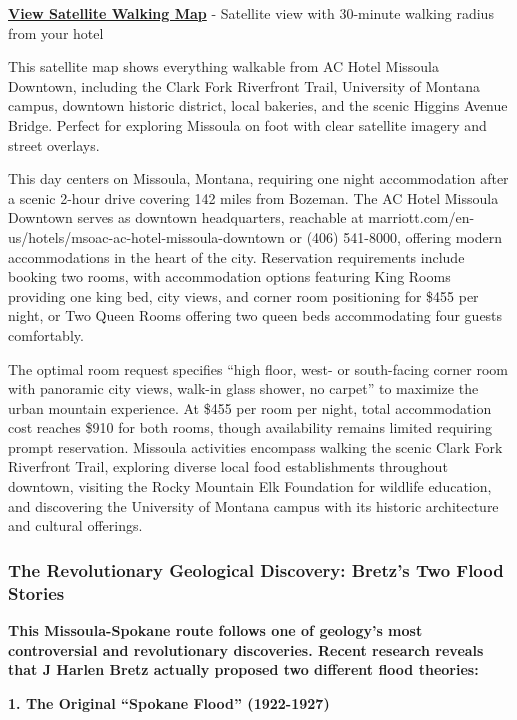 \documentclass[
  11pt,
  letterpaper,
  DIV=10,
  numbers=noendperiod]{scrartcl}
\begin{document}
\textbf{\href{images/missoula_mt_walking_map.html}{View Satellite
Walking Map}} - Satellite view with 30-minute walking radius from your
hotel

This satellite map shows everything walkable from AC Hotel Missoula
Downtown, including the Clark Fork Riverfront Trail, University of
Montana campus, downtown historic district, local bakeries, and the
scenic Higgins Avenue Bridge. Perfect for exploring Missoula on foot
with clear satellite imagery and street overlays.

This day centers on Missoula, Montana, requiring one night accommodation
after a scenic 2-hour drive covering 142 miles from Bozeman. The AC
Hotel Missoula Downtown serves as downtown headquarters, reachable at
marriott.com/en-us/hotels/msoac-ac-hotel-missoula-downtown or (406)
541-8000, offering modern accommodations in the heart of the city.
Reservation requirements include booking two rooms, with accommodation
options featuring King Rooms providing one king bed, city views, and
corner room positioning for \$455 per night, or Two Queen Rooms offering
two queen beds accommodating four guests comfortably.

The optimal room request specifies ``high floor, west- or south-facing
corner room with panoramic city views, walk-in glass shower, no carpet''
to maximize the urban mountain experience. At \$455 per room per night,
total accommodation cost reaches \$910 for both rooms, though
availability remains limited requiring prompt reservation. Missoula
activities encompass walking the scenic Clark Fork Riverfront Trail,
exploring diverse local food establishments throughout downtown,
visiting the Rocky Mountain Elk Foundation for wildlife education, and
discovering the University of Montana campus with its historic
architecture and cultural offerings.

\subsubsection{\texorpdfstring{\textbf{The Revolutionary Geological
Discovery: Bretz's Two Flood
Stories}}{The Revolutionary Geological Discovery: Bretz's Two Flood Stories}}\label{the-revolutionary-geological-discovery-bretzs-two-flood-stories}

\textbf{This Missoula-Spokane route follows one of geology's most
controversial and revolutionary discoveries. Recent research reveals
that J Harlen Bretz actually proposed two different flood theories:}

\textbf{1. The Original ``Spokane Flood'' (1922-1927)}
\end{document}

